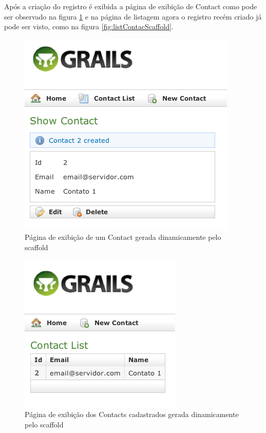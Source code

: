 \documentclass[12pt]{article}
\begin{document}
  Após a criação do registro é exibida a página de exibição de Contact como pode 
  ser observado na figura \ref{fig:showContactScaffold} e na página de listagem
  agora o registro recém criado já pode ser visto, como na figura \ref{fig:listContacScaffold}.

   \begin{figure}[h!]
      \centering
      \includegraphics[width=.4\textwidth]{images/showContactScaffold.png}
      \caption{Página de exibição de um Contact gerada dinamicamente pelo scaffold}
      \label{fig:showContactScaffold}
  \end{figure}
  
   \begin{figure}[h!]
      \centering
      \includegraphics[width=.4\textwidth]{images/listContactScaffold.png}
      \caption{Página de exibição dos Contacts cadastrados gerada dinamicamente pelo scaffold}
      \label{fig:listContactScaffold}
  \end{figure}
  
\end{document}
